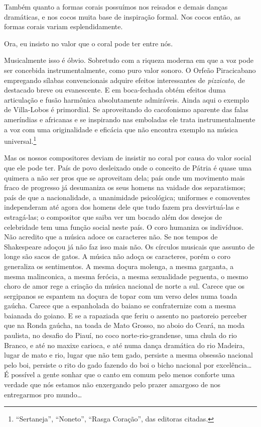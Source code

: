 Também quanto a formas corais possuímos nos reisados e demais danças
dramáticas, e nos cocos muita base de inspiração formal. Nos cocos
então, as formas corais variam esplendidamente.

Ora, eu insisto no valor que o coral pode ter entre nós.

Musicalmente isso é óbvio. Sobretudo com a riqueza moderna em que a voz
pode ser concebida instrumentalmente, como puro valor sonoro. O Orfeão
Piracicabano empregando sílabas convencionais adquire efeitos
interessantes de \textit{pizzicato}, de destacado breve ou evanescente. E em
boca-fechada obtém efeitos duma articulação e fusão harmônica
absolutamente admiráveis. Ainda aqui o exemplo de Villa-Lobos é
primordial. Se aproveitando do cacofonismo aparente das falas ameríndias
e africanas e se inspirando nas emboladas ele trata instrumentalmente a
voz com uma originalidade e eficácia que não encontra exemplo na música
universal.\footnote{``Sertaneja'', ``Noneto'', ``Rasga Coração'', das editoras citadas.}

Mas os nossos compositores deviam de insistir no coral por causa do
valor social que ele pode ter. País de povo desleixado onde o conceito
de Pátria é quase uma quimera a não ser pros que se aproveitam dela;
país onde um movimento mais fraco de progresso já desumaniza os seus
homens na vaidade dos separatismos; país de que a nacionalidade, a
unanimidade psicológica; uniformes e comoventes independeram até agora
dos homens dele que tudo fazem pra desvirtuá-las e estragá-las; o
compositor que saiba ver um bocado além dos desejos de celebridade tem
uma função social neste país. O coro humaniza os indivíduos. Não
acredito que a música adoce os caracteres não. Se nos tempos de
Shakespeare adoçou já não faz isso mais não. Os círculos musicais que
assunto de longe são sacos de gatos. A música não adoça os caracteres,
porém o coro generaliza os sentimentos. A mesma doçura molenga, a mesma
garganta, a mesma malinconica, a mesma ferócia, a mesma sexualidade
peguenta, o mesmo choro de amor rege a criação da música nacional de
norte a sul. Carece que os sergipanos se espantem na doçura de topar com
um verso deles numa toada gaúcha. Carece que a espanholada do baiano se
confraternize com a mesma baianada do goiano. E se a rapaziada que
feriu o assento no pastoreio perceber que na Ronda gaúcha, na toada
de Mato Grosso, no aboio do Ceará, na moda paulista, no desafio do
Piauí, no coco norte-rio-grandense, uma chula do rio Branco, e até no
maxixe carioca, e até numa dança dramática do rio Madeira, lugar de mato
e rio, lugar que não tem gado, persiste a mesma obsessão nacional pelo
boi, persiste o rito do gado fazendo do boi o bicho nacional por
excelência\ldots{} É possível a gente sonhar que o canto em comum pelo menos
conforte uma verdade que nós estamos não enxergando pelo prazer amargoso
de nos entregarmos pro mundo\ldots{}

